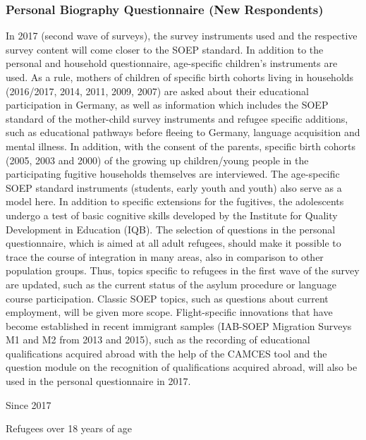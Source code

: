 \documentclass[letterpaper,10pt,openany,onesideH,english]{sphinxmanual}
\begin{document}
\subsubsection{Personal Biography Questionnaire (New Respondents)}
\label{\detokenize{Contents of SOEPcore/index:id31}}
In 2017 (second wave of surveys), the survey instruments used and the respective survey content will come closer to the SOEP standard. In addition to the personal and household questionnaire, age-specific children’s instruments are used. As a rule, mothers of children of specific birth cohorts living in households (2016/2017, 2014, 2011, 2009, 2007) are asked about their educational participation in Germany, as well as information which includes the SOEP standard of the mother-child survey instruments and refugee specific additions, such as educational pathways before fleeing to Germany, language acquisition and mental illness.  In addition, with the consent of the parents, specific birth cohorts (2005, 2003 and 2000) of the growing up children/young people in the participating fugitive households themselves are interviewed. The age-specific SOEP standard instruments (students, early youth and youth) also serve as a model here. In addition to specific extensions for the fugitives, the adolescents undergo a test of basic cognitive skills developed by the Institute for Quality Development in Education (IQB). The selection of questions in the personal questionnaire, which is aimed at all adult refugees, should make it possible to trace the course of integration in many areas, also in comparison to other population groups. Thus, topics specific to refugees in the first wave of the survey are updated, such as the current status of the asylum procedure or language course participation. Classic SOEP topics, such as questions about current employment, will be given more scope. Flight-specific innovations that have become established in recent immigrant samples (IAB-SOEP Migration Surveys M1 and M2 from 2013 and 2015), such as the recording of educational qualifications acquired abroad with the help of the CAMCES tool and the question module on the recognition of qualifications acquired abroad, will also be used in the personal questionnaire in 2017.

 Since 2017

 Refugees over 18 years of age
\end{document}
